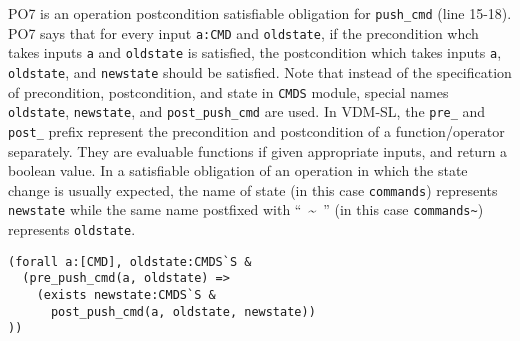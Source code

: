 PO7 is an operation postcondition satisfiable obligation for {\tt push\_cmd} (line 15-18). PO7 says that for every input {\tt a:CMD} and {\tt oldstate}, if the precondition whch takes inputs {\tt a} and {\tt oldstate} is satisfied, the postcondition which takes inputs {\tt a}, {\tt oldstate}, and {\tt newstate} should be satisfied. Note that instead of the specification of precondition, postcondition, and state in {\tt CMDS} module, special names {\tt oldstate}, {\tt newstate}, and {\tt post\_push\_cmd} are used. In VDM-SL, the {\tt pre\_} and {\tt post\_} prefix represent the precondition and postcondition of a function/operator separately. They are evaluable functions if given appropriate inputs, and return a boolean value. In a satisfiable obligation of an operation in which the state change is usually expected, the name of state (in this case {\tt commands}) represents {\tt newstate} while the same name postfixed with ``~\textasciitilde~'' (in this case {\tt commands\textasciitilde}) represents {\tt oldstate}.

\begin{mdframed}[roundcorner=5pt]
\begin{Verbatim}[fontsize=\small]
(forall a:[CMD], oldstate:CMDS`S & 
  (pre_push_cmd(a, oldstate) => 
    (exists newstate:CMDS`S & 
      post_push_cmd(a, oldstate, newstate))
))
\end{Verbatim}
\end{mdframed}
